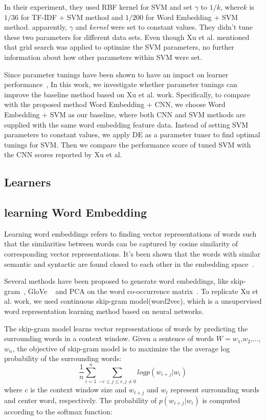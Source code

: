 In their experiment, they used RBF kernel for SVM and set $\gamma$ to $1/k$,
where$k$ is $1/36$ for TF-IDF + SVM method and $1/200$ for Word Embedding + SVM method.
apparently, $\gamma$ and {\it kernel} were set to constant values.  They didn't tune these two
parameters for different data sets. Even though Xu et al. mentioned that grid search was applied to optimize the SVM parameters, 
no further information about how other parameters within SVM  were set.


Since parameter tunings have been shown to have an impact on 
learner performance~\cite{fu2016tuning, fu2016differential, agrawal2016wrong}, 
In this work, we investigate whether parameter tunings can improve the baseline method based on Xu et al. work.
Specifically, to compare with the proposed method Word Embedding + CNN, we choose Word Embedding + SVM
as our baseline, where both CNN and SVM methods are supplied with the same word embedding feature data. 
Instead of setting SVM parameters to constant values, we apply DE as a parameter tuner to find optimal tunings
for SVM. Then we compare the performance score of tuned SVM  with the CNN scores reported by Xu et al. 

\subsection{Learners}



\subsection{learning Word Embedding}
Learning word embeddings refers to finding vector representations
of words such that the similarities between words can be captured by cosine similarity of corresponding 
vector representations. It's been shown that the words with similar semantic and syntactic are found closed
to each other in the embedding space~\cite{mikolov2013distributed}.

Several methods have been proposed to generate word embeddings, 
like skip-gram~\cite{mikolov2013distributed}, GloVe ~\cite{pennington2014glove}
and PCA on the word co-occurrence matrix~\cite{lebret2013word}. To replicate Xu et al. work,
we used continuous skip-gram model(word2vec),  which is a unsupervised word representation learning method based on
neural networks. 

The skip-gram model learns vector representations of words
 by predicting the surrounding words in a context window. 
 Given a sentence of words $W =w_1$,$w_2$,...,$w_n$, the objective of skip-gram model is to maximize the
 the average log probability of the surrounding words:
 \begin{equation*}
 \frac{1}{n}\sum_{i=1}^{n} \sum_{-c\leq j \leq c, j \neq 0} log p(w_{i+j}|w_i)
\end{equation*}
where $c$ is the context window size and $w_{t+j}$ and $w_{t}$ represent surrounding words and center word, respectively.
The probability of $p(w_{i+j}|w_i)$ is computed according to the softmax function:

